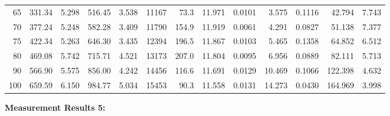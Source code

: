 \documentclass[10pt]{article}
\begin{document}
{\begin{tabular}{|r|rr|rr|rr|rr|rr|r|r|}
       65 &       331.34 &        5.298 &       516.45 &        3.538 &        11167 &         73.3 &       11.971 &       0.0101 &        3.575 &       0.1116 &       42.794 &        7.743 \\
       70 &       377.24 &        5.248 &       582.28 &        3.409 &        11790 &        154.9 &       11.919 &       0.0061 &        4.291 &       0.0827 &       51.138 &        7.377 \\
       75 &       422.34 &        5.263 &       646.30 &        3.435 &        12394 &        196.5 &       11.867 &       0.0103 &        5.465 &       0.1358 &       64.852 &        6.512 \\
       80 &       469.08 &        5.742 &       715.71 &        4.521 &        13173 &        207.0 &       11.804 &       0.0095 &        6.956 &       0.0889 &       82.111 &        5.713 \\
       90 &       566.90 &        5.575 &       856.00 &        4.242 &        14456 &        116.6 &       11.691 &       0.0129 &       10.469 &       0.1066 &      122.398 &        4.632 \\
      100 &       659.59 &        6.150 &       984.77 &        5.034 &        15453 &         90.3 &       11.558 &       0.0131 &       14.273 &       0.0430 &      164.969 &        3.998 \\
\hline
\end{tabular}
}

\vspace{3mm}

\noindent
{\large \bf Measurement Results 5:}
\vspace{3mm}
\end{document}
